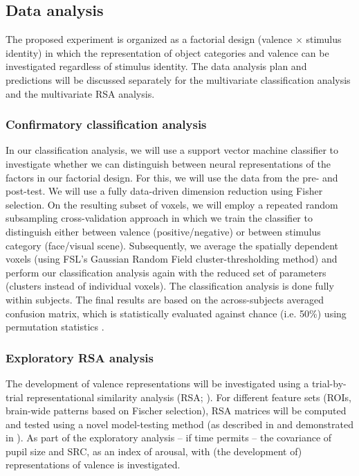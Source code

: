 \documentclass[12pt,a4paper]{article}\usepackage[]{graphicx}\usepackage[]{color}
\begin{document}
\subsection{Data analysis}
The proposed experiment is organized as a factorial design (valence $\times$ stimulus identity) in which the representation of object categories and valence can be investigated regardless of stimulus identity. The data analysis plan and predictions will be discussed separately for the multivariate classification analysis and the multivariate RSA analysis.

\subsubsection{Confirmatory classification analysis}
In our classification analysis, we will use a support vector machine classifier to investigate whether we can distinguish between neural representations of the factors in our factorial design. For this, we will use the data from the pre- and post-test. We will use a fully data-driven dimension reduction using Fisher selection. On the resulting subset of voxels, we will employ a repeated random subsampling cross-validation approach in which we train the classifier to distinguish either between valence (positive/negative) or between stimulus category (face/visual scene). Subsequently, we average the spatially dependent voxels (using FSL's Gaussian Random Field cluster-thresholding method) and perform our classification analysis again with the reduced set of parameters (clusters instead of individual voxels). The classification analysis is done fully within subjects. The final results are based on the across-subjects averaged confusion matrix, which is statistically evaluated against chance (i.e. 50\%) using permutation statistics \citep{nichols2002}.     

\subsubsection{Exploratory RSA analysis}
The development of valence representations will be investigated using a trial-by-trial representational similarity analysis (RSA; \citealp{kriegeskorte2008}). For different feature sets (ROIs, brain-wide patterns based on Fischer selection), RSA matrices will be computed and tested using a novel model-testing method (as described in \citealp{walther2015} and demonstrated in \citealp{kornysheva2014}). As part of the exploratory analysis -- if time permits -- the covariance of pupil size and SRC, as an index of arousal, with (the development of) representations of valence is investigated.
\end{document}
